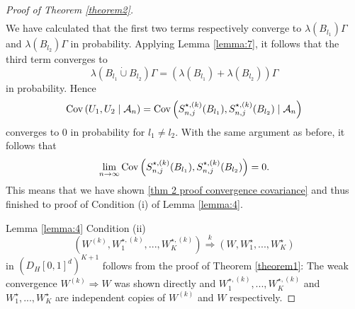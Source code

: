 \begin{proof}[Proof of Theorem \ref{theorem2}]
\begin{align*}
    \end{align*}
    We have calculated that the first two terms respectively converge to $\lambda(B_{l_1}) \Gamma$ and $\lambda(B_{l_2}) \Gamma$ in probability. Applying Lemma \ref{lemma:7}, it follows that the third term converges to
    \[ \lambda(B_{l_1} \dot{\cup} B_{l_2} ) \Gamma = (\lambda(B_{l_1}) + \lambda(B_{l_2})) \Gamma \]
    in probability. Hence 
    \[  \mathrm{Cov}\left( U_1, U_2 \mid \mathcal{A}_n \right) = \mathrm{Cov}\left( S_{n, j}^{\star, (k)}(B_{l_1}), S_{n, j}^{\star, (k)}(B_{l_2}) \mid \mathcal{A}_n \right) \]
    converges to $0$ in probability for $l_1 \neq l_2$. With the same argument as before, it follows that
    \[ \lim\limits_{n \to \infty} \mathrm{Cov}\left( S_{n, j}^{\star, (k)}(B_{l_1}), S_{n, j}^{\star, (k)}(B_{l_2}) \right) = 0. \]
    This means that we have shown \eqref{thm 2 proof convergence covariance} and thus finished to proof of Condition (i) of Lemma \ref{lemma:4}.
    

    Lemma \ref{lemma:4} Condition (ii)
    \[ (W^{(k)}, W_1^{\star, (k)}, ..., W_K^{\star, (k)}) \stackrel{k}{\Rightarrow} (W, W_1^\star, ..., W_K^\star) \]
    in $(D_H[0,1]^d)^{K+1}$ follows from the proof of Theorem \ref{theorem1}: The weak convergence $W^{(k)} \Rightarrow W$ was shown directly and $W_1^{\star, (k)}, ..., W_K^{\star, (k)}$ and $W_1^\star, ..., W_K^\star$ are independent copies of $W^{(k)}$ and $W$ respectively.


\end{proof}
